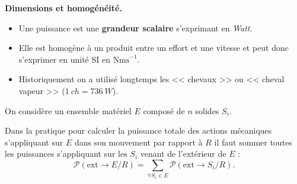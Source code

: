 \documentclass[10pt,fleqn]{article} %
\begin{document}
\begin{warn}\textbf{Dimensions et homogénéité.}
\begin{itemize}
\item Une puissance est une \textbf{grandeur scalaire} s'exprimant en \textit{Watt}.
\item Elle est homogène à un produit entre un effort et une vitesse et peut donc s'exprimer en unité SI en $\text{Nms}^{-1}$.
\item Historiquement on a utilisé longtemps les << chevaux >> ou << cheval vapeur >> ($\SI{1}{ch}= \SI{736}{W}$).
\end{itemize}

\end{warn}

\begin{prop}
On considère un ensemble matériel $E$ composé de $n$ solides $S_i$. 

Dans la pratique pour calculer la puissance totale des actions mécaniques s'appliquant sur $E$ dans son mouvement par rapport à $R$ il faut sommer toutes les puissances s'appliquant sur les $S_i$ venant de l'extérieur de $E$ :
$$
\mathcal{P}(\text{ext} \rightarrow E/R)=\displaystyle{\sum_{\forall S_i \in E}\mathcal{P}(\text{ext} \rightarrow S_i/R)}.
$$
\end{prop}

%
%
%
\end{document}
